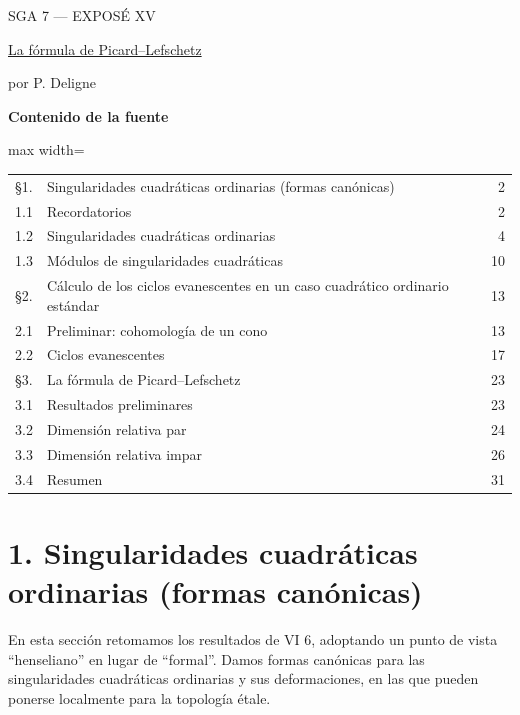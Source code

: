 \pageoriginale

\clearpage
{}
\begin{center}
{\large SGA 7 --- EXPOSÉ XV}\par
\vspace{2em}
{\Large\underline{La fórmula de Picard--Lefschetz}}\par
\vspace{1.5em}
{\large por P. Deligne}
\end{center}

\medskip
\noindent\textbf{Contenido de la fuente}
\begin{center}
\begin{adjustbox}{max width=\linewidth}\begin{tabular}{@{}llr@{}}
\S1. & Singularidades cuadráticas ordinarias (formas canónicas) & 2\\
1.1 & Recordatorios & 2\\
1.2 & Singularidades cuadráticas ordinarias & 4\\
1.3 & Módulos de singularidades cuadráticas & 10\\
\S2. & Cálculo de los ciclos evanescentes en un caso cuadrático
  ordinario estándar & 13\\
2.1 & Preliminar: cohomología de un cono & 13\\
2.2 & Ciclos evanescentes & 17\\
\S3. & La fórmula de Picard--Lefschetz & 23\\
3.1 & Resultados preliminares & 23\\
3.2 & Dimensión relativa par & 24\\
3.3 & Dimensión relativa impar & 26\\
3.4 & Resumen & 31
\end{tabular}\end{adjustbox}
\end{center}

\pageoriginale

\section*{1. Singularidades cuadráticas ordinarias (formas canónicas)}

En esta sección retomamos los resultados de VI 6, adoptando un punto de
vista ``henseliano'' en lugar de ``formal''. Damos formas canónicas para
las singularidades cuadráticas ordinarias y sus deformaciones, en las
que pueden ponerse localmente para la topología étale.

